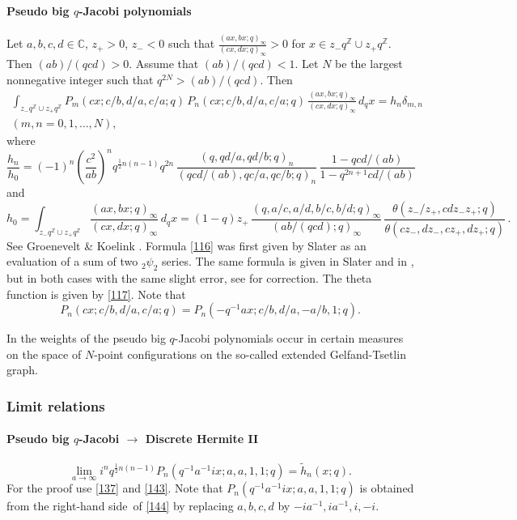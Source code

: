 \documentclass[twoside,11pt]{article}
\newcommand\CC{\mathbb{C}}
\newcommand\ZZ{\mathbb{Z}}
\newcommand\de\delta
\newcommand\tha\theta
\newcommand\half{\frac12}
\newcommand\iy\infty
\newcommand\wt{\widetilde}
\newcommand\RHS{right-hand side}
\begin{document}
\paragraph{Pseudo big $q$-Jacobi polynomials}
Let $a,b,c,d\in\CC$, $z_+>0$, $z_-<0$ such that
$\tfrac{(ax,bx;q)_\iy}{(cx,dx;q)_\iy}>0$ for $x\in z_- q^\ZZ\cup z_+ q^\ZZ$.
Then $(ab)/(qcd)>0$. Assume that $(ab)/(qcd)<1$.
Let $N$ be the largest nonnegative integer such that $q^{2N}>(ab)/(qcd)$.
Then
\begin{multline}
\int_{z_- q^\ZZ\cup z_+ q^\ZZ}P_m(cx;c/b,d/a,c/a;q)\,P_n(cx;c/b,d/a,c/a;q)\,
\frac{(ax,bx;q)_\iy}{(cx,dx;q)_\iy}\,d_qx=h_n\de_{m,n}\\
(m,n=0,1,\ldots,N),
\label{114}
\end{multline}
where
\begin{equation}
\frac{h_n}{h_0}=(-1)^n\left(\frac{c^2}{ab}\right)^n q^{\half n(n-1)} q^{2n}\,
\frac{(q,qd/a,qd/b;q)_n}{(qcd/(ab),qc/a,qc/b;q)_n}\,
\frac{1-qcd/(ab)}{1-q^{2n+1}cd/(ab)}
\label{115}
\end{equation}
and
\begin{equation}
h_0=\int_{z_- q^\ZZ\cup z_+ q^\ZZ}\frac{(ax,bx;q)_\iy}{(cx,dx;q)_\iy}\,d_qx
=(1-q)z_+\,
\frac{(q,a/c,a/d,b/c,b/d;q)_\iy}{(ab/(qcd);q)_\iy}\,
\frac{\tha(z_-/z_+,cdz_-z_+;q)}{\tha(cz_-,dz_-,cz_+,dz_+;q)}\,.
\label{116}
\end{equation}
See Groenevelt \& Koelink \cite[Prop.~2.2]{K14}.
Formula \eqref{116} was first given by Slater \cite[(5)]{K15} as an evaluation
of a sum of two ${}_2\psi_2$ series.
The same formula is given in Slater  and in
, but in both cases with the same slight error,
see \cite[2nd paragraph after Lemma 2.1]{K14} for correction.
The theta function is given by \eqref{117}.
Note that
\begin{equation}
P_n(cx;c/b,d/a,c/a;q)=P_n(-q^{-1}ax;c/b,d/a,-a/b,1;q).
\label{145}
\end{equation}

In \cite{K29} the weights of the pseudo big $q$-Jacobi polynomials
occur in certain measures on the space of $N$-point configurations
on the so-called extended Gelfand-Tsetlin graph.
%
\subsubsection*{Limit relations}
\paragraph{Pseudo big $q$-Jacobi $\longrightarrow$ Discrete Hermite II}
\begin{equation}
\lim_{a\to\iy}i^n q^{\half n(n-1)} P_n(q^{-1}a^{-1}ix;a,a,1,1;q)=
\wt h_n(x;q).
\label{144}
\end{equation}
For the proof use \eqref{137} and \eqref{143}.
Note that $P_n(q^{-1}a^{-1}ix;a,a,1,1;q)$ is obtained from the
\RHS\ of \eqref{144} by replacing $a,b,c,d$ by $-ia^{-1},ia^{-1},i,-i$.
%
\end{document}

